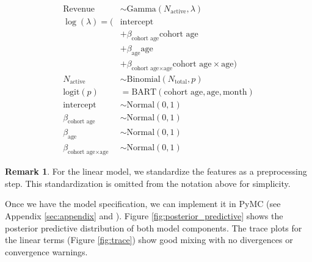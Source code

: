 \documentclass[11pt]{amsart}
\theoremstyle{definition}
\newtheorem{remark}{Remark}
\begin{document}
\begin{align*}
    \text{Revenue}                              & \sim \text{Gamma}(N_{\text{active}}, \lambda)                                      \\
    \log(\lambda) = (                           & \text{intercept}                                                                   \\
                                                & + \beta_{\text{cohort age}} \text{cohort age}                                      \\
                                                & + \beta_{\text{age}} \text{age}                                                    \\
                                                & + \beta_{\text{cohort age} \times \text{age}} \text{cohort age} \times \text{age}) \\
    N_{\text{active}}                           & \sim \text{Binomial}(N_{\text{total}}, p)                                          \\
    \textrm{logit}(p)                           & = \text{BART}(\text{cohort age}, \text{age}, \text{month})                         \\
    \text{intercept}                            & \sim \text{Normal}(0, 1)                                                           \\
    \beta_{\text{cohort age}}                   & \sim \text{Normal}(0, 1)                                                           \\
    \beta_{\text{age}}                          & \sim \text{Normal}(0, 1)                                                           \\
    \beta_{\text{cohort age} \times \text{age}} & \sim \text{Normal}(0, 1)
\end{align*}

\begin{remark}
    For the linear model, we standardize the features as a preprocessing step. This standardization is omitted from the
    notation above for simplicity.
\end{remark}

Once we have the model specification, we can implement it in PyMC \cite{pymc2023} (see Appendix \ref{sec:appendix} and
\cite{orduz_revenue_retention}). Figure \ref{fig:posterior_predictive} shows the posterior predictive distribution of both
model components. The trace plots for the linear terms (Figure \ref{fig:trace}) show good mixing with no divergences or
convergence warnings.
\end{document}
